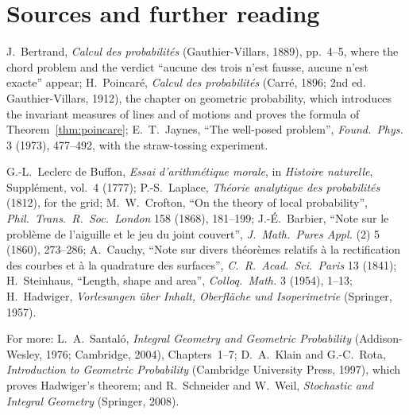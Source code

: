 \section*{Sources and further reading}

J.~Bertrand, \emph{Calcul des probabilités} (Gauthier-Villars, 1889), pp.~4--5, where the chord problem and the verdict ``aucune des trois n'est fausse, aucune n'est exacte'' appear;
H.~Poincaré, \emph{Calcul des probabilités} (Carré, 1896; 2nd ed. Gauthier-Villars, 1912), the chapter on geometric probability, which introduces the invariant measures of lines and of motions and proves the formula of
Theorem~\ref{thm:poincare}; E.~T.~Jaynes, ``The well-posed problem'', \emph{Found.\ Phys.} 3 (1973), 477--492, with the straw-tossing experiment.

G.-L.~Leclerc de Buffon, \emph{Essai d'arithmétique morale}, in \emph{Histoire naturelle}, Supplément, vol.~4 (1777); P.-S.~Laplace, \emph{Théorie analytique des probabilités} (1812), for the grid; M.~W.~Crofton,
``On the theory of local probability'', \emph{Phil.\ Trans.\ R.\ Soc.\ London} 158 (1868), 181--199; J.-É.~Barbier, ``Note sur le problème de l'aiguille et le jeu du joint couvert'', \emph{J.\ Math.\ Pures Appl.} (2) 5 (1860),
273--286; A.~Cauchy, ``Note sur divers théorèmes relatifs à la rectification des courbes et à la quadrature des surfaces'', \emph{C.\ R.\ Acad.\ Sci.\ Paris} 13 (1841); H.~Steinhaus, ``Length,
shape and area'', \emph{Colloq.\ Math.} 3 (1954), 1--13; H.~Hadwiger, \emph{Vorlesungen über Inhalt, Oberfläche und Isoperimetrie} (Springer, 1957).

For more: L.~A.~Santaló, \emph{Integral Geometry and Geometric Probability} (Addison-Wesley, 1976; Cambridge, 2004), Chapters~1--7; D.~A.~Klain and G.-C.~Rota, \emph{Introduction to Geometric
Probability} (Cambridge University Press, 1997), which proves Hadwiger's theorem; and R.~Schneider and W.~Weil, \emph{Stochastic and Integral Geometry} (Springer, 2008).
